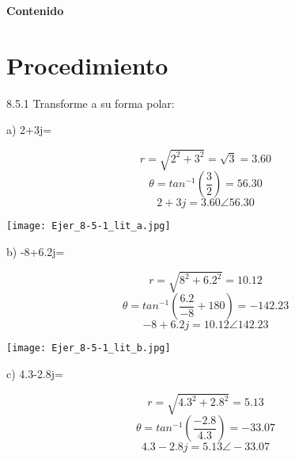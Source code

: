 \documentclass[a4paper, 11pt]{article}
\begin{document}
\textbf{}
\newpage

\begin{flushright}
\textbf{\Huge Contenido}
\end{flushright}

\renewcommand*\contentsname{}
{%
\tableofcontents
}



\newpage

\section{Procedimiento}

8.5.1 Transforme a su forma polar:

a) 2+3j=

\begin{equation*}
r=\sqrt{2^{2}+3^{2}}=\sqrt{3}=3.60
\end{equation*}
\begin{equation*}
\theta=tan^{-1}(\frac{3}{2})=56.30
\end{equation*}
\begin{equation*}
2+3j=3.60\angle56.30
\end{equation*}

\texttt{[image: Ejer\_8-5-1\_lit\_a.jpg]}

b) -8+6.2j=

\begin{equation*}
r=\sqrt{8^{2}+6.2^{2}}=10.12
\end{equation*}
\begin{equation*}
\theta=tan^{-1}(\frac{6.2}{-8}+180)=-142.23
\end{equation*}
\begin{equation*}
-8+6.2j=10.12\angle142.23
\end{equation*}

\texttt{[image: Ejer\_8-5-1\_lit\_b.jpg]}

c) 4.3-2.8j=

\begin{equation*}
r=\sqrt{4.3^{2}+2.8^{2}}=5.13
\end{equation*}
\begin{equation*}
\theta=tan^{-1}(\frac{-2.8}{4.3})=-33.07
\end{equation*}
\begin{equation*}
4.3-2.8j=5.13\angle-33.07
\end{equation*}
\end{document}
